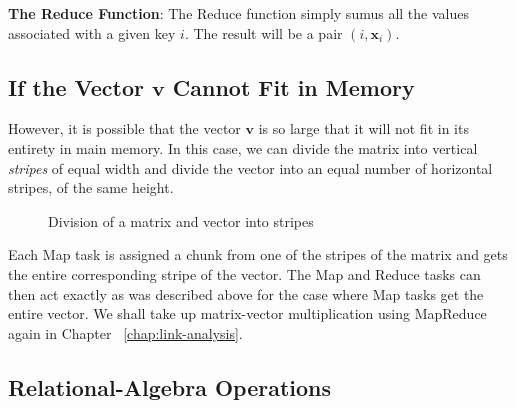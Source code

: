 \textbf{The Reduce Function}: The Reduce function simply sumus all the values associated with a given key $i$. The result will be a pair $(i, \mathbf{x}_i)$.

\subsection{If the Vector $\mathbf{v}$ Cannot Fit in Memory}\label{subsec:vector-v-cannot-fit-in-memory}

However, it is possible that the vector $\mathbf{v}$ is so large that it will not fit in its entirety in main memory. In this case, we can divide the matrix into vertical \textit{stripes} of equal width and divide the vector into an equal number of horizontal stripes, of the same height.

\begin{figure}[H]
\centering
{}
\caption{Division of a matrix and vector into stripes}
\label{fig:matrix-vector-stripes}
\end{figure}


Each Map task is assigned a chunk from one of the stripes of the matrix and gets the entire corresponding stripe of the vector. The Map and Reduce tasks can then act exactly as was described above for the case where Map tasks get the entire vector. We shall take up matrix-vector multiplication using MapReduce again in Chapter ~\ref{chap:link-analysis}.

\subsection{Relational-Algebra Operations}\label{subsec:relational-algebra-operations}

